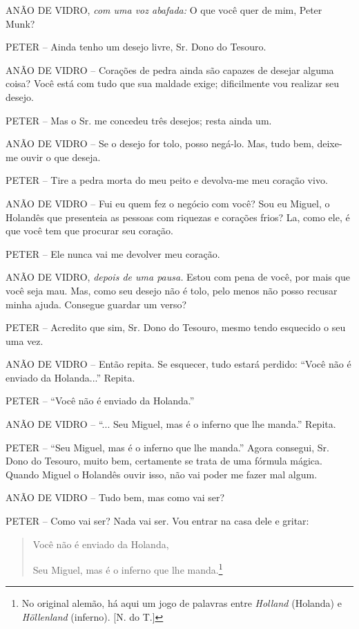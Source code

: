 ANÃO DE VIDRO, \emph{com uma voz abafada:} O que você quer de mim, Peter
Munk?

PETER -- Ainda tenho um desejo livre, Sr. Dono do Tesouro.

ANÃO DE VIDRO -- Corações de pedra ainda são capazes de desejar alguma
coisa? Você está com tudo que sua maldade exige; dificilmente vou
realizar seu desejo.

PETER -- Mas o Sr. me concedeu três desejos; resta ainda um.

ANÃO DE VIDRO -- Se o desejo for tolo, posso negá-lo. Mas, tudo bem,
deixe-me ouvir o que deseja.

PETER -- Tire a pedra morta do meu peito e devolva-me meu coração vivo.

ANÃO DE VIDRO -- Fui eu quem fez o negócio com você? Sou eu Miguel, o
Holandês que presenteia as pessoas com riquezas e corações frios? La,
como ele, é que você tem que procurar seu coração.

PETER -- Ele nunca vai me devolver meu coração.

ANÃO DE VIDRO, \emph{depois de uma pausa.} Estou com pena de você, por
mais que você seja mau. Mas, como seu desejo não é tolo, pelo menos não
posso recusar minha ajuda. Consegue guardar um verso?

PETER -- Acredito que sim, Sr. Dono do Tesouro, mesmo tendo esquecido o
seu uma vez.

ANÃO DE VIDRO -- Então repita. Se esquecer, tudo estará perdido: ``Você
não é enviado da Holanda...'' Repita.

PETER -- ``Você não é enviado da Holanda.''

ANÃO DE VIDRO -- ``... Seu Miguel, mas é o inferno que lhe manda.''
Repita.

PETER -- ``Seu Miguel, mas é o inferno que lhe manda.'' Agora consegui,
Sr. Dono do Tesouro, muito bem, certamente se trata de uma fórmula
mágica. Quando Miguel o Holandês ouvir isso, não vai poder me fazer mal
algum.

ANÃO DE VIDRO -- Tudo bem, mas como vai ser?

PETER -- Como vai ser? Nada vai ser. Vou entrar na casa dele e gritar:

\begin{quote}
Você não é enviado da Holanda,

Seu Miguel, mas é o inferno que lhe manda.\footnote{No original alemão,
  há aqui um jogo de palavras entre \emph{Holland} (Holanda) e
  \emph{Höllenland} (inferno). {[}N. do T.{]}}
\end{quote}

